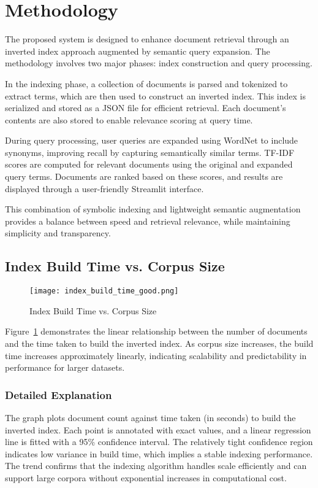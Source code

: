 \documentclass[conference]{IEEEtran}
\begin{document}
\section{Methodology}
The proposed system is designed to enhance document retrieval through an inverted index approach augmented by semantic query expansion. The methodology involves two major phases: index construction and query processing.

In the indexing phase, a collection of documents is parsed and tokenized to extract terms, which are then used to construct an inverted index. This index is serialized and stored as a JSON file for efficient retrieval. Each document's contents are also stored to enable relevance scoring at query time.

During query processing, user queries are expanded using WordNet to include synonyms, improving recall by capturing semantically similar terms. TF-IDF scores are computed for relevant documents using the original and expanded query terms. Documents are ranked based on these scores, and results are displayed through a user-friendly Streamlit interface.

This combination of symbolic indexing and lightweight semantic augmentation provides a balance between speed and retrieval relevance, while maintaining simplicity and transparency.

\subsection{Index Build Time vs. Corpus Size}
\begin{figure}[htbp]
    \centering
    \texttt{[image: index\_build\_time\_good.png]}
    \caption{Index Build Time vs. Corpus Size}
    \label{fig:build-time}
\end{figure}
Figure~\ref{fig:build-time} demonstrates the linear relationship between the number of documents and the time taken to build the inverted index. As corpus size increases, the build time increases approximately linearly, indicating scalability and predictability in performance for larger datasets.

\subsubsection*{Detailed Explanation}
The graph plots document count against time taken (in seconds) to build the inverted index. Each point is annotated with exact values, and a linear regression line is fitted with a 95\% confidence interval. The relatively tight confidence region indicates low variance in build time, which implies a stable indexing performance. The trend confirms that the indexing algorithm handles scale efficiently and can support large corpora without exponential increases in computational cost.
\end{document}
